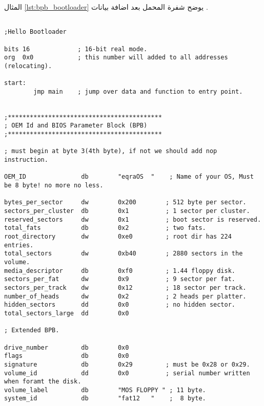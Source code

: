 \documentclass[document.tex]{subfiles}
\begin{document}

المثال \ref{lst:bpb_bootloader} يوضح شفرة المحمل بعد اضافة بيانات .


\begin{english}

\lstset{numberstyle=\tiny,numbers=left,stepnumber=1,numbersep=5pt,tabsize=2,extendedchars=true,breaklines=true,frame=b,showspaces=false, showtabs=false,xleftmargin=10pt,framexleftmargin=10pt,framexrightmargin=5pt,framexbottommargin=4pt,showstringspaces=false,language=[x86masm]Assembler}

\begin{lstlisting}[label=lst:bpb_bootloader,caption=\en{BPB example}]

;Hello Bootloader

bits 16				; 16-bit real mode.
org	 0x0			; this number will added to all addresses (relocating).

start:
		jmp main	; jump over data and function to entry point.
		
		
;******************************************
; OEM Id and BIOS Parameter Block (BPB) 
;******************************************

; must begin at byte 3(4th byte), if not we should add nop instruction.

OEM_ID               db        "eqraOS  "    ; Name of your OS, Must be 8 byte! no more no less.

bytes_per_sector     dw        0x200		; 512 byte per sector.
sectors_per_cluster  db        0x1          ; 1 sector per cluster.
reserved_sectors     dw        0x1          ; boot sector is reserved.
total_fats           db        0x2          ; two fats.
root_directory       dw        0xe0         ; root dir has 224 entries.
total_sectors        dw        0xb40        ; 2880 sectors in the volume.
media_descriptor     db        0xf0         ; 1.44 floppy disk.
sectors_per_fat      dw        0x9          ; 9 sector per fat.
sectors_per_track    dw        0x12         ; 18 sector per track.
number_of_heads      dw        0x2          ; 2 heads per platter.
hidden_sectors       dd        0x0          ; no hidden sector.
total_sectors_large  dd        0x0

; Extended BPB.

drive_number         db        0x0
flags                db        0x0
signature            db        0x29         ; must be 0x28 or 0x29.
volume_id            dd        0x0          ; serial number written when foramt the disk.
volume_label         db        "MOS FLOPPY " ; 11 byte.
system_id            db        "fat12   "    ;  8 byte.



\end{lstlisting}
\end{english}
\end{document}
